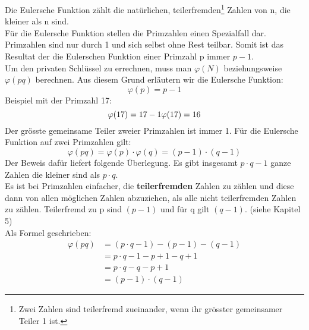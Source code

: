 Die Eulersche Funktion zählt die natürlichen, teilerfremden\footnote{Zwei Zahlen sind teilerfremd zueinander, wenn ihr grösster gemeinsamer Teiler 1 ist.}  Zahlen von n, die kleiner als n sind.\\
Für die Eulersche Funktion stellen die Primzahlen einen Spezialfall dar.
Primzahlen sind nur durch 1 und sich selbst ohne Rest teilbar. Somit ist das Resultat der die Eulerschen Funktion einer Primzahl p immer $p - 1$.\\
Um den privaten Schlüssel zu errechnen, muss man $\varphi(N)$ beziehungsweise $\varphi(pq)$ berechnen. Aus diesem Grund erläutern wir die Eulersche Funktion:
%
\begin{equation*}
  \varphi(p) = p - 1
\end{equation*}
%
Beispiel mit der Primzahl 17:
\begin{equation*}
	\varphi(17) = 17 - 1 \\
	\varphi(17) = 16 \\
\end{equation*}
Der grösste gemeinsame Teiler zweier Primzahlen ist immer 1.
Für die Eulersche Funktion auf zwei Primzahlen gilt:
\begin{equation}
  \varphi(pq) = \varphi(p) \cdot \varphi(q) = (p - 1) \cdot (q - 1)
  \label{eqn:eulersche_func}
\end{equation}
Der Beweis dafür liefert folgende Überlegung. Es gibt insgesamt $p \cdot q -1$ ganze Zahlen die kleiner sind als $p \cdot q$.\\
Es ist bei Primzahlen einfacher, die \textbf{teilerfremden} Zahlen zu zählen und diese dann von allen möglichen Zahlen abzuziehen, als alle nicht teilerfremden Zahlen zu zählen. Teilerfremd zu p sind $(p - 1) $ und für q gilt $ (q - 1) $. (siehe \cite{kryptologie} Kapitel 5)\\
Als Formel geschrieben:
%
\begin{equation*}
  \begin{split}
    \varphi(pq) & = (p \cdot q - 1) - (p - 1) - (q - 1)  \\
     & = p \cdot q - 1 - p + 1 - q + 1  \\
     & = p \cdot q - q - p + 1  \\
     & = (p -1) \cdot (q - 1)
    \label{eqn:herleitung_eulersche_func}
  \end{split}
\end{equation*}
